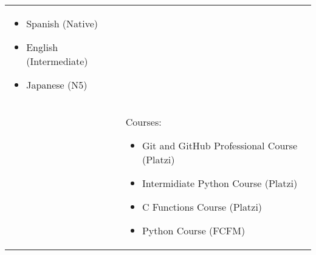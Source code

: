 \documentclass[twoside,letter,openright,10pt]{report}
\begin{document}
\begin{table}[hbt!]
\begin{tabular}{p{40mm}p{140mm}}
\begin{itemize}[noitemsep,nolistsep]
\item Spanish (Native)
\item English (Intermediate)
\item Japanese (N5)
\vspace{-4mm}
\end{itemize}
\\
& Courses:
\begin{itemize}[noitemsep,nolistsep]
\item Git and GitHub Professional Course (Platzi)
\item Intermidiate Python Course (Platzi)
\item C Functions Course (Platzi)
\item Python Course (FCFM)
\vspace{-4mm}
\end{itemize}
\end{tabular}
\end{table}
\end{document}
